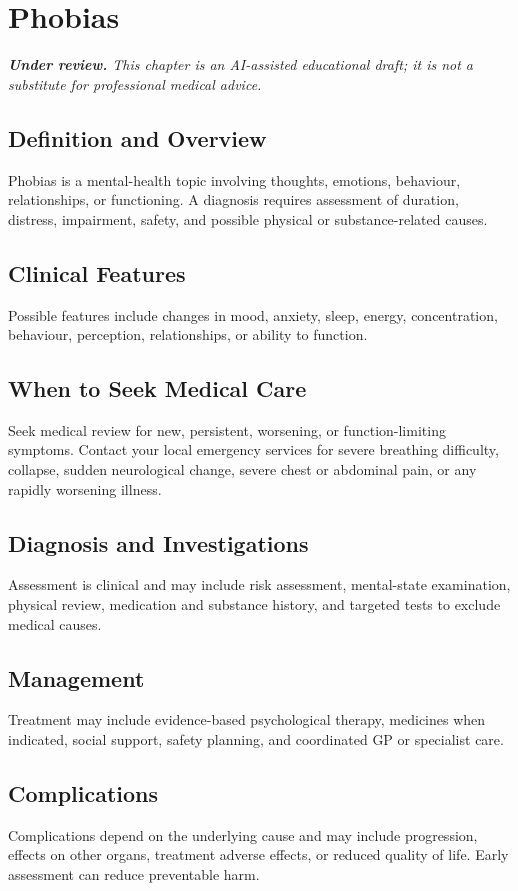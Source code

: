 \chapter{Phobias}

\medskip
\noindent\textit{\textbf{Under review.} This chapter is an AI-assisted educational draft; it is not a substitute for professional medical advice.}

\section*{Definition and Overview}
Phobias is a mental-health topic involving thoughts, emotions, behaviour, relationships, or functioning. A diagnosis requires assessment of duration, distress, impairment, safety, and possible physical or substance-related causes.

\section*{Clinical Features}
Possible features include changes in mood, anxiety, sleep, energy, concentration, behaviour, perception, relationships, or ability to function.

\section*{When to Seek Medical Care}
Seek medical review for new, persistent, worsening, or function-limiting symptoms. Contact your local emergency services for severe breathing difficulty, collapse, sudden neurological change, severe chest or abdominal pain, or any rapidly worsening illness.

\section*{Diagnosis and Investigations}
Assessment is clinical and may include risk assessment, mental-state examination, physical review, medication and substance history, and targeted tests to exclude medical causes.

\section*{Management}
Treatment may include evidence-based psychological therapy, medicines when indicated, social support, safety planning, and coordinated GP or specialist care.

\section*{Complications}
Complications depend on the underlying cause and may include progression, effects on other organs, treatment adverse effects, or reduced quality of life. Early assessment can reduce preventable harm.

